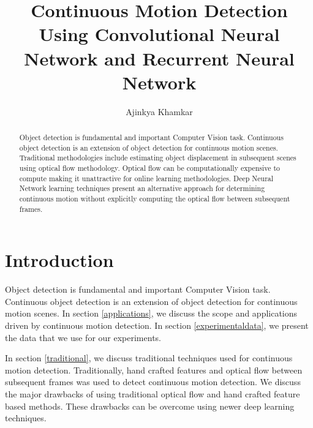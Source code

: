 \documentclass[sigconf]{acmart}
\begin{document}
\title{Continuous Motion Detection Using Convolutional Neural Network and Recurrent Neural Network}


\author{Ajinkya Khamkar}

\renewcommand{\shortauthors}{K. Ajinkya}


\begin{abstract}

Object detection is fundamental and important Computer Vision task. Continuous object detection is an extension of object detection for continuous motion scenes. Traditional methodologies include estimating object displacement in subsequent scenes using optical flow methodology. Optical flow can be computationally expensive to compute making it unattractive for online learning methodologies. Deep Neural Network learning techniques present an alternative approach for determining continuous motion without explicitly computing the optical flow between subsequent frames.
\end{abstract}



\maketitle

\section{Introduction}

Object detection is fundamental and important Computer Vision task. Continuous object detection is an extension of object detection for continuous motion scenes. In section \ref{applications}, we discuss the scope and applications driven by continuous motion detection. In section \ref{experimentaldata}, we present the data that we use for our experiments. 

In section \ref{traditional}, we discuss traditional techniques used for continuous motion detection. Traditionally, hand crafted features \cite{articlezhou} and optical flow \cite{LK} between subsequent frames was used to detect continuous motion detection. We discuss the major drawbacks of using traditional optical flow and hand crafted feature based methods. These drawbacks can be overcome using newer deep learning techniques. 
\end{document}
